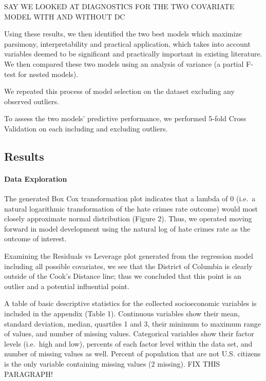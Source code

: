 \documentclass[
]{article}
\begin{document}
SAY WE LOOKED AT DIAGNOSTICS FOR THE TWO COVARIATE MODEL WITH AND
WITHOUT DC

Using these results, we then identified the two best models which
maximize parsimony, interpretability and practical application, which
takes into account variables deemed to be significant and practically
important in existing literature. We then compared these two models
using an analysis of variance (a partial F-test for nested models).

We repeated this process of model selection on the dataset excluding any
observed outliers.

To assess the two models' predictive performance, we performed 5-fold
Cross Validation on each including and excluding outliers.

\hypertarget{results}{%
\subsection{Results}\label{results}}

\hypertarget{data-exploration-1}{%
\paragraph{Data Exploration}\label{data-exploration-1}}

The generated Box Cox transformation plot indicates that a lambda of 0
(i.e.~a natural logarithmic transformation of the hate crimes rate
outcome) would most closely approximate normal distribution (Figure 2).
Thus, we operated moving forward in model development using the natural
log of hate crimes rate as the outcome of interest.

Examining the Residuals vs Leverage plot generated from the regression
model including all possible covariates, we see that the District of
Columbia is clearly outside of the Cook's Distance line; thus we
concluded that this point is an outlier and a potential influential
point.

A table of basic descriptive statistics for the collected socioeconomic
variables is included in the appendix (Table 1). Continuous variables
show their mean, standard deviation, median, quartiles 1 and 3, their
minimum to maximum range of values, and number of missing values.
Categorical variables show their factor levels (i.e.~high and low),
percents of each factor level within the data set, and number of missing
values as well. Percent of population that are not U.S. citizens is the
only variable containing missing values (2 missing). FIX THIS PARAGRAPH!
\end{document}
